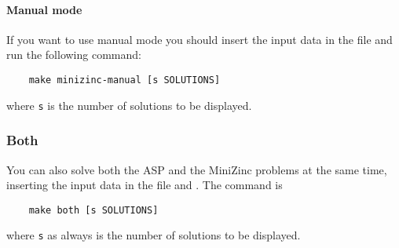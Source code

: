 \paragraph{Manual mode}

If you want to use manual mode you should insert the input data in the file  and run the following command:
\begin{verbatim}
    make minizinc-manual [s SOLUTIONS]
\end{verbatim}
where \texttt{s} is the number of solutions to be displayed.

\subsubsection{Both}
You can also solve both the ASP and the MiniZinc problems at the same time, inserting the input data in the file  and . The command is
\begin{verbatim}
    make both [s SOLUTIONS]
\end{verbatim}
where \texttt{s} as always is the number of solutions to be displayed.